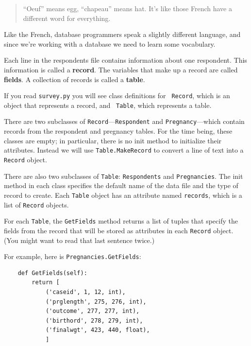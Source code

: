\documentclass[12pt]{book}
\begin{document}
\begin{quote}
``Oeuf'' means egg, ``chapeau'' means hat.  It's like those French
  have a different word for everything.
\end{quote}


Like the French, database programmers speak a slightly
different language, and since we're working with a database we need
to learn some vocabulary.


Each line in the respondents file contains information about one
respondent.  This information is called a {\bf record}.  The
variables that make up a record are called {\bf fields}.  A
collection of records is called a {\bf table}.


If you read {\tt survey.py} you will see class definitions for {\tt
  Record}, which is an object that represents a record, and {\tt
  Table}, which represents a table.

There are two subclasses of
{\tt Record}---{\tt Respondent} and {\tt Pregnancy}---which
contain records from the respondent and pregnancy tables.
For the time being, these classes are empty; in particular, there
is no init method to initialize their attributes.  Instead
we will use {\tt Table.MakeRecord} to convert a line of text into
a {\tt Record} object.


There are also two subclasses of {\tt Table}: {\tt Respondents}
and {\tt Pregnancies}.  The init method in each class
specifies the default name of the data file and the type of
record to create.  Each {\tt Table} object has an attribute
named {\tt records}, which is a list of {\tt Record} objects.

For each {\tt Table}, the {\tt GetFields} method returns
a list of tuples that specify the fields from the record that
will be stored as attributes in each {\tt Record} object.  (You
might want to read that last sentence twice.)

For example, here is {\tt Pregnancies.GetFields}:

\begin{verbatim}
    def GetFields(self):
        return [
            ('caseid', 1, 12, int),
            ('prglength', 275, 276, int),
            ('outcome', 277, 277, int),
            ('birthord', 278, 279, int),
            ('finalwgt', 423, 440, float),
            ]
\end{verbatim}
\end{document}
